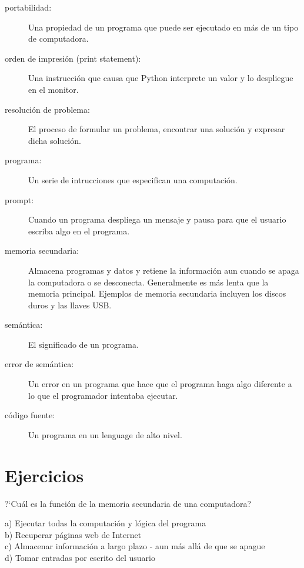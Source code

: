 \begin{description}
\item[portabilidad:]  Una propiedad de un programa que puede ser ejecutado en m\'as de un tipo de computadora.

\item[orden de impresi\'on (print statement):]  Una instrucci\'on que causa que Python
interprete un valor y lo despliegue en el monitor.

\item[resoluci\'on de problema:]  El proceso de formular un problema, encontrar una soluci\'on y expresar dicha soluci\'on.

\item[programa:] Un serie de intrucciones que especifican una computaci\'on.

\item[prompt:] Cuando un programa despliega un mensaje y pausa para que el usuario escriba algo en el programa.

\item[memoria secundaria:] Almacena programas y datos y retiene la informaci\'on aun cuando se apaga la computadora o se desconecta. Generalmente es m\'as lenta que la memoria principal. Ejemplos de memoria secundaria incluyen los discos duros y las llaves USB.

\item[sem\'antica:]  El significado de un programa.

\item[error de sem\'antica:]   Un error en un programa que hace que el programa haga algo diferente a lo que el programador intentaba ejecutar.

\item[c\'odigo fuente:]  Un programa en un lenguage de alto nivel.

\end{description}

\section{Ejercicios}


\begin{ex}
?`Cu\'al es la funci\'on de la memoria secundaria de una computadora?

a) Ejecutar todas la computaci\'on y l\'ogica del programa\\
b) Recuperar p\'aginas web de Internet\\
c) Almacenar informaci\'on a largo plazo - aun m\'as all\'a de que se apague\\
d) Tomar entradas por escrito del usuario 
\end{ex}


